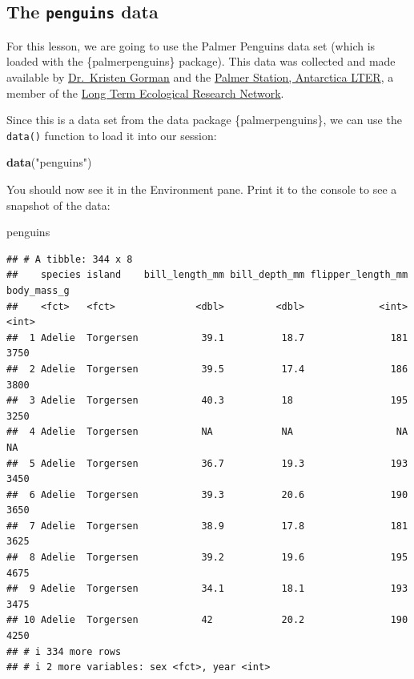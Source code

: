 \documentclass[
]{book}
\newenvironment{Shaded}{\begin{snugshade}}{\end{snugshade}}
\newcommand{\FunctionTok}[1]{\textcolor[rgb]{0.13,0.29,0.53}{\textbf{#1}}}
\newcommand{\NormalTok}[1]{#1}
\newcommand{\StringTok}[1]{\textcolor[rgb]{0.31,0.60,0.02}{#1}}
\begin{document}
\hypertarget{the-penguins-data-1}{%
\subsection{\texorpdfstring{The \texttt{penguins} data}{The penguins data}}\label{the-penguins-data-1}}

For this lesson, we are going to use the Palmer Penguins data set (which is loaded with the \{palmerpenguins\} package). This data was collected and made available by \href{https://www.uaf.edu/cfos/people/faculty/detail/kristen-gorman.php}{Dr.~Kristen Gorman} and the \href{https://pallter.marine.rutgers.edu/}{Palmer Station, Antarctica LTER}, a member of the \href{https://lternet.edu/}{Long Term Ecological Research Network}.

Since this is a data set from the data package \{palmerpenguins\}, we can use the \texttt{data()} function to load it into our session:

\begin{Shaded}
\begin{Highlighting}[]
\FunctionTok{data}\NormalTok{(}\StringTok{"penguins"}\NormalTok{)}
\end{Highlighting}
\end{Shaded}

You should now see it in the Environment pane. Print it to the console to see a snapshot of the data:

\begin{Shaded}
\begin{Highlighting}[]
\NormalTok{penguins}
\end{Highlighting}
\end{Shaded}

\begin{verbatim}
## # A tibble: 344 x 8
##    species island    bill_length_mm bill_depth_mm flipper_length_mm body_mass_g
##    <fct>   <fct>              <dbl>         <dbl>             <int>       <int>
##  1 Adelie  Torgersen           39.1          18.7               181        3750
##  2 Adelie  Torgersen           39.5          17.4               186        3800
##  3 Adelie  Torgersen           40.3          18                 195        3250
##  4 Adelie  Torgersen           NA            NA                  NA          NA
##  5 Adelie  Torgersen           36.7          19.3               193        3450
##  6 Adelie  Torgersen           39.3          20.6               190        3650
##  7 Adelie  Torgersen           38.9          17.8               181        3625
##  8 Adelie  Torgersen           39.2          19.6               195        4675
##  9 Adelie  Torgersen           34.1          18.1               193        3475
## 10 Adelie  Torgersen           42            20.2               190        4250
## # i 334 more rows
## # i 2 more variables: sex <fct>, year <int>
\end{verbatim}
\end{document}
